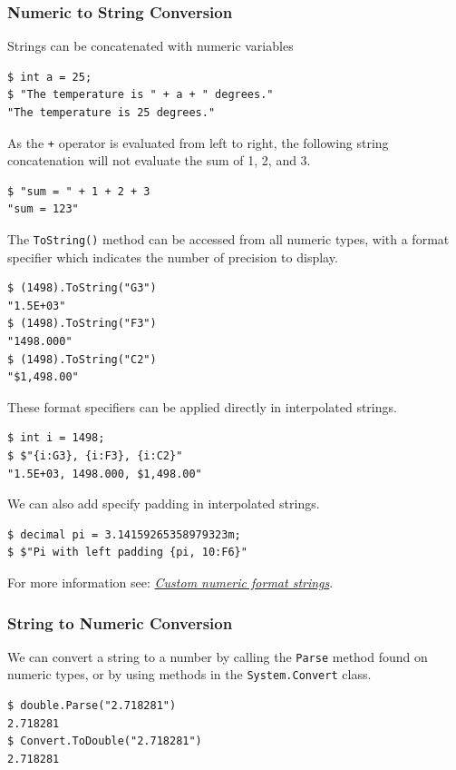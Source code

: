 \documentclass{article}
\begin{document}
\subsubsection{Numeric to String Conversion}
Strings can be concatenated with numeric variables
\begin{lstlisting}
$ int a = 25;
$ "The temperature is " + a + " degrees."
"The temperature is 25 degrees."
\end{lstlisting}
As the \lstinline!+! operator is evaluated from left to right, the following string concatenation 
will not evaluate the sum of 1, 2, and 3.
\begin{lstlisting}
$ "sum = " + 1 + 2 + 3
"sum = 123"
\end{lstlisting}
The \lstinline!ToString()! method can be accessed from all numeric types, with a 
format specifier which indicates the number of precision to display.
\begin{lstlisting}
$ (1498).ToString("G3")
"1.5E+03"
$ (1498).ToString("F3")
"1498.000"
$ (1498).ToString("C2")
"$1,498.00"
\end{lstlisting}
These format specifiers can be applied directly in interpolated strings.
\begin{lstlisting}
$ int i = 1498;
$ $"{i:G3}, {i:F3}, {i:C2}"
"1.5E+03, 1498.000, $1,498.00"
\end{lstlisting}
We can also add specify padding in interpolated strings.
\begin{lstlisting}
$ decimal pi = 3.14159265358979323m;
$ $"Pi with left padding {pi, 10:F6}"
\end{lstlisting}
For more information see: \href{https://docs.microsoft.com/en-us/dotnet/standard/base-types/custom-numeric-format-strings}{\textit{Custom numeric format strings}}.
\subsubsection{String to Numeric Conversion}
We can convert a string to a number by calling the \lstinline!Parse! method found on numeric types,
or by using methods in the \lstinline!System.Convert! class.
\begin{lstlisting}
$ double.Parse("2.718281")
2.718281
$ Convert.ToDouble("2.718281")
2.718281
\end{lstlisting}
\end{document}
